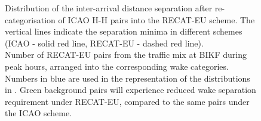 \begin{figure}[h]
    \centering
    
    
    
    \caption[Inter-arrival distance separation of ICAO H-H pairs into the RECAT-EU scheme]{\protect{} Distribution of the inter-arrival distance separation after re-categorisation of ICAO H-H pairs into the RECAT-EU scheme. The vertical lines indicate the separation minima in different schemes (ICAO - solid red line, RECAT-EU - dashed red line).\\ \protect{} Number of RECAT-EU pairs from the traffic mix at BIKF during peak hours, arranged into the corresponding wake categories. Numbers in blue are used in the representation of the distributions in \protect{}. Green background pairs will experience reduced wake separation requirement under RECAT-EU, compared to the same pairs under the ICAO scheme.}
    \label{fig:HH_to_RECAT_pairs_dist_separ}
\end{figure}

